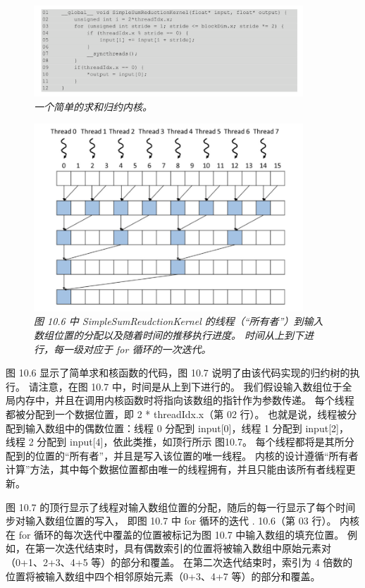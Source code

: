 \begin{figure}[H]
	\centering
	\includegraphics[width=0.9\textwidth]{figs/F10.6.png}
	\caption{\textit{一个简单的求和归约内核。}}
\end{figure}

\begin{figure}[H]
	\centering
	\includegraphics[width=0.9\textwidth]{figs/F10.7.png}
	\caption{\textit{图 10.6 中 SimpleSumReudctionKernel 的线程（“所有者”）到输入数组位置的分配以及随着时间的推移执行进度。 时间从上到下进行，每一级对应于 for 循环的一次迭代。}}
\end{figure}

图 10.6 显示了简单求和核函数的代码，图 10.7 说明了由该代码实现的归约树的执行。 
请注意，在图 10.7 中，时间是从上到下进行的。 
我们假设输入数组位于全局内存中，并且在调用内核函数时将指向该数组的指针作为参数传递。 
每个线程都被分配到一个数据位置，即 2 * threadIdx.x（第 02 行）。 
也就是说，线程被分配到输入数组中的偶数位置：线程 0 分配到 input[0]，线程 1 分配到 input[2]，
线程 2 分配到 input[4]，依此类推，如顶行所示 图10.7。 
每个线程都将是其所分配到的位置的“所有者”，并且是写入该位置的唯一线程。 
内核的设计遵循“所有者计算”方法，其中每个数据位置都由唯一的线程拥有，并且只能由该所有者线程更新。

图 10.7 的顶行显示了线程对输入数组位置的分配，随后的每一行显示了每个时间步对输入数组位置的写入，
即图 10.7 中 for 循环的迭代 . 10.6（第 03 行）。 
内核在 for 循环的每次迭代中覆盖的位置被标记为图 10.7 中输入数组的填充位置。 
例如，在第一次迭代结束时，具有偶数索引的位置将被输入数组中原始元素对（0+1、2+3、4+5 等）的部分和覆盖。 
在第二次迭代结束时，索引为 4 倍数的位置将被输入数组中四个相邻原始元素（0+3、4+7 等）的部分和覆盖。


